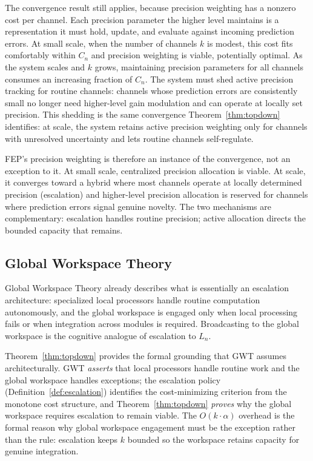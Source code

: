 \documentclass[11pt]{article}
\theoremstyle{definition}
\begin{document}
The convergence result still applies, because precision weighting has
a nonzero cost per channel. Each precision parameter the higher level
maintains is a representation it must hold, update, and evaluate against
incoming prediction errors. At small scale, when the number of
channels $k$ is modest, this cost fits comfortably within $C_n$ and
precision weighting is viable, potentially optimal. As the system
scales and $k$ grows, maintaining precision parameters for all channels
consumes an increasing fraction of $C_n$. The system must shed active
precision tracking for routine channels: channels whose prediction
errors are consistently small no longer need higher-level gain
modulation and can operate at locally set precision. This shedding is
the same convergence Theorem~\ref{thm:topdown} identifies: at scale,
the system retains active precision weighting only for channels with
unresolved uncertainty and lets routine channels self-regulate.

FEP's precision weighting is therefore an instance of the convergence,
not an exception to it. At small scale, centralized precision
allocation is viable. At scale, it converges toward a hybrid where
most channels operate at locally determined precision (escalation) and
higher-level precision allocation is reserved for channels where
prediction errors signal genuine novelty. The two mechanisms are
complementary: escalation handles routine precision; active allocation
directs the bounded capacity that remains.

\subsection{Global Workspace Theory}

Global Workspace Theory \cite{Baars1988,Dehaene2011} already
describes what is essentially an escalation architecture: specialized
local processors handle routine computation autonomously, and the
global workspace is engaged only when local processing fails or when
integration across modules is required. Broadcasting to the global
workspace is the cognitive analogue of escalation to $L_n$.

Theorem~\ref{thm:topdown} provides the formal grounding that GWT
assumes architecturally. GWT \emph{asserts} that local processors
handle routine work and the global workspace handles exceptions;
the escalation policy (Definition~\ref{def:escalation}) identifies the
cost-minimizing criterion from the monotone cost structure, and
Theorem~\ref{thm:topdown}
\emph{proves} why the global workspace requires escalation to remain
viable. The $O(k \cdot \alpha)$ overhead is the formal
reason why global workspace engagement must be the exception rather
than the rule: escalation keeps $k$ bounded so the workspace retains
capacity for genuine integration.
\end{document}
